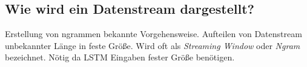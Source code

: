 %
        \subsection{Wie wird ein Datenstream dargestellt?}\label{sec:streamdarstellung}
            Erstellung von ngrammen bekannte Vorgehensweise.
            Aufteilen von Datenstream unbekannter Länge in feste Größe.
            Wird oft als \textit{Streaming Window} oder \textit{Ngram} bezeichnet.
            Nötig da \ac{LSTM} Eingaben fester Größe benötigen.

